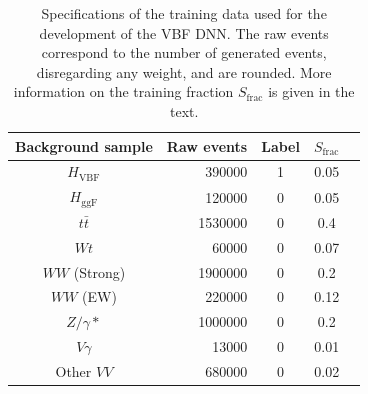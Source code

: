 \begin{table}[ht]
    \centering
    \small
    \begin{tabular}{ c  | r c c c}
        \toprule
        Background sample  & Raw events & Label & $S_\text{frac}$ \\
        \midrule
        $H_{\mathrm{VBF}}$ & 390000     & 1     & 0.05            \\
        $H_{\mathrm{ggF}}$ & 120000     & 0     & 0.05            \\
        $t\bar{t}$         & 1530000    & 0     & 0.4             \\
        $Wt$               & 60000      & 0     & 0.07            \\
        $WW$ (Strong)      & 1900000    & 0     & 0.2             \\
        $WW$ (EW)          & 220000     & 0     & 0.12            \\
        $Z/\gamma*$        & 1000000    & 0     & 0.2             \\
        $V\gamma$          & 13000      & 0     & 0.01            \\
        Other $VV$         & 680000     & 0     & 0.02            \\
        \bottomrule
    \end{tabular}
    \caption[Specifications of the training data used for the DNN development.]{Specifications of the training data used for the development of the VBF DNN. The raw events correspond to the number of generated events, disregarding any weight, and are rounded. More information on the training fraction $S_\text{frac}$ is given in the text.}
    \label{tab:DNNtrainingstats}
\end{table}
